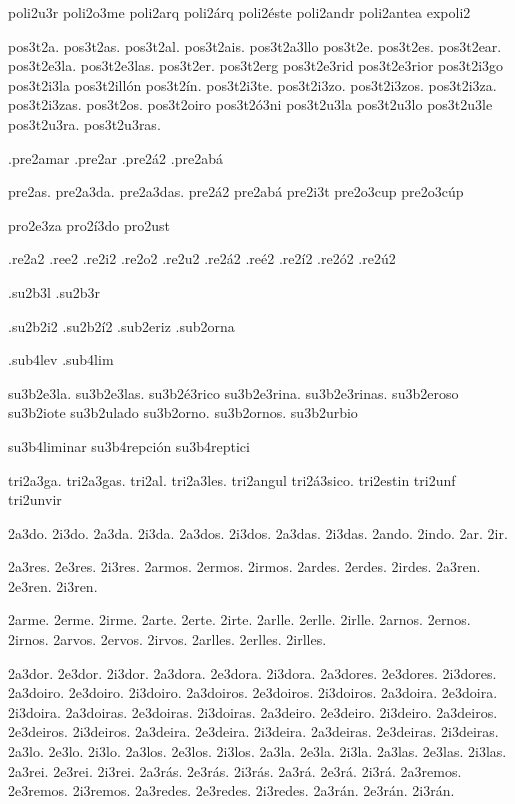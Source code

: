 {%

poli2u3r 
poli2o3me 
poli2arq 
poli2árq 
poli2éste 
poli2andr 
poli2antea 
expoli2 

pos3t2a. 
pos3t2as. 
pos3t2al. 
pos3t2ais. 
pos3t2a3llo 
pos3t2e. 
pos3t2es. 
pos3t2ear. 
pos3t2e3la. 
pos3t2e3las. 
pos3t2er. 
pos3t2erg 
pos3t2e3rid 
pos3t2e3rior 
pos3t2i3go 
pos3t2i3la 
pos3t2illón 
pos3t2ín. 
pos3t2i3te. 
pos3t2i3zo. 
pos3t2i3zos. 
pos3t2i3za. 
pos3t2i3zas. 
pos3t2os. 
pos3t2oiro 
pos3t2ó3ni 
pos3t2u3la 
pos3t2u3lo 
pos3t2u3le 
pos3t2u3ra. 
pos3t2u3ras. 


.pre2amar 
.pre2ar 
.pre2á2 
.pre2abá 

pre2as. 
pre2a3da. 
pre2a3das. 
pre2á2 
pre2abá 
pre2i3t 
pre2o3cup 
pre2o3cúp 


pro2e3za 
pro2í3do 
pro2ust 

.re2a2 .ree2 .re2i2 .re2o2 .re2u2 .re2á2 .reé2 .re2í2 .re2ó2 .re2ú2 

.su2b3l .su2b3r 

.su2b2i2 
.su2b2í2 
.sub2eriz 
.sub2orna 

.sub4lev 
.sub4lim 

su3b2e3la. 
su3b2e3las. 
su3b2é3rico 
su3b2e3rina. 
su3b2e3rinas. 
su3b2eroso 
su3b2iote 
su3b2ulado 
su3b2orno. 
su3b2ornos. 
su3b2urbio 

su3b4liminar 
su3b4repción 
su3b4reptici 


tri2a3ga. 
tri2a3gas. 
tri2al. 
tri2a3les. 
tri2angul 
tri2á3sico. 
tri2estin 
tri2unf 
tri2unvir 


2a3do. 2i3do. 
2a3da. 2i3da. 
2a3dos. 2i3dos. 
2a3das. 2i3das. 
2ando. 2indo. 
2ar. 2ir. 

2a3res. 2e3res. 2i3res. 
2armos. 2ermos. 2irmos. 
2ardes. 2erdes. 2irdes. 
2a3ren. 2e3ren. 2i3ren. 

2arme. 2erme. 2irme. 
2arte. 2erte. 2irte. 
2arlle. 2erlle. 2irlle. 
2arnos. 2ernos. 2irnos. 
2arvos. 2ervos. 2irvos. 
2arlles. 2erlles. 2irlles. 

2a3dor. 2e3dor. 2i3dor. 
2a3dora. 2e3dora. 2i3dora. 
2a3dores. 2e3dores. 2i3dores. 
2a3doiro. 2e3doiro. 2i3doiro. 
2a3doiros. 2e3doiros. 2i3doiros. 
2a3doira. 2e3doira. 2i3doira. 
2a3doiras. 2e3doiras. 2i3doiras. 
2a3deiro. 2e3deiro. 2i3deiro. 
2a3deiros. 2e3deiros. 2i3deiros. 
2a3deira. 2e3deira. 2i3deira. 
2a3deiras. 2e3deiras. 2i3deiras. 
2a3lo. 2e3lo. 2i3lo. 
2a3los. 2e3los. 2i3los. 
2a3la. 2e3la. 2i3la. 
2a3las. 2e3las. 2i3las. 
2a3rei. 2e3rei. 2i3rei. 
2a3rás. 2e3rás. 2i3rás. 
2a3rá. 2e3rá. 2i3rá. 
2a3remos. 2e3remos. 2i3remos. 
2a3redes. 2e3redes. 2i3redes. 
2a3rán. 2e3rán. 2i3rán. 

}
